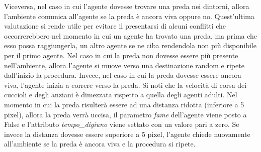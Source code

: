 \documentclass[11pt]{article}
\begin{document}
Viceversa, nel caso in cui l'agente dovesse trovare una preda nei dintorni, allora l'ambiente comunica all'agente se la preda è ancora viva oppure no. Quest'ultima valutazione si rende utile per evitare il presentarsi di alcuni conflitti che occorrerebbero nel momento in cui un agente ha trovato una preda, ma prima che esso possa raggiungerla, un altro agente se ne ciba rendendola non più disponibile per il primo agente.
Nel caso in cui la preda non dovesse essere più presente nell'ambiente, allora l'agente si muove verso una destinazione random e ripete dall'inizio la procedura. Invece, nel caso in cui la preda dovesse essere ancora viva, l'agente inizia a correre verso la preda. Si noti che la velocità di corsa dei cuccioli e degli anziani è dimezzata rispetto a quella degli agenti adulti. Nel momento in cui la preda risulterà essere ad una distanza ridotta (inferiore a 5 pixel), allora la preda verrà uccisa, il parametro \emph{fame} dell'agente viene posto a False e l'attributo \emph{tempo\_digiuno} viene settato con un valore pari a zero. Se invece la distanza dovesse essere superiore a 5 pixel, l'agente chiede nuovamente all'ambiente se la preda è ancora viva e la procedura si ripete. 
\end{document}
